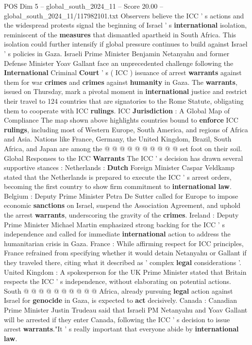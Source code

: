 \begin{textsample}{POS Dim 5 – global\_south\_2024\_11 – Score 20.00 – global\_south\_2024\_11/117982101.txt}
Observers believe the ICC ' s actions and the widespread protests signal the beginning of Israel ' s \textbf{international} isolation, reminiscent of the \textbf{measures} that dismantled apartheid in South Africa.
This isolation could further intensify if global pressure continues to build against Israel ' s policies in Gaza.
Israeli Prime Minister Benjamin Netanyahu and former Defense Minister Yoav Gallant face an unprecedented challenge following the \textbf{International} Criminal \textbf{Court} ' s ( ICC ) issuance of arrest \textbf{warrants} against them for war \textbf{crimes} and \textbf{crimes} against \textbf{humanity} in Gaza.
The \textbf{warrants}, issued on Thursday, mark a pivotal moment in \textbf{international} justice and restrict their travel to 124 countries that are signatories to the Rome Statute, obligating them to cooperate with ICC \textbf{rulings}.
ICC \textbf{Jurisdiction} : A Global Map of Compliance The map shown above highlights countries bound to \textbf{enforce} ICC \textbf{rulings}, including most of Western Europe, South America, and regions of Africa and Asia.
Nations like France, Germany, the United Kingdom, Brazil, South Africa, and Japan are among the @ @ @ @ @ @ @ @ @ @ set foot on their soil.
Global Responses to the ICC \textbf{Warrants} The ICC ' s decision has drawn several supportive stances : Netherlands : \textbf{Dutch} Foreign Minister Caspar Veldkamp stated that the Netherlands is prepared to execute the ICC ' s arrest orders, becoming the first country to show firm commitment to \textbf{international} \textbf{law}.
Belgium : Deputy Prime Minister Petra De Sutter called for Europe to impose economic \textbf{sanctions} on Israel, suspend the Association Agreement, and uphold the arrest \textbf{warrants}, underscoring the gravity of the \textbf{crimes}.
Ireland : Deputy Prime Minister Michael Martin emphasized strong backing for the ICC ' s independence and called for immediate \textbf{international} action to address the humanitarian crisis in Gaza.
France : While affirming respect for ICC principles, France refrained from specifying whether it would detain Netanyahu or Gallant if they traveled there, citing what it described as ' complex \textbf{legal} considerations '.
United Kingdom : A spokesperson for the UK Prime Minister stated that Britain respects the ICC ' s independence, without elaborating on potential actions.
South @ @ @ @ @ @ @ @ @ @ Africa, already pursuing \textbf{legal} action against Israel for \textbf{genocide} in Gaza, is expected to \textbf{act} decisively.
Canada : Canadian Prime Minister Justin Trudeau said that Israeli PM Netanyahu and Yoav Gallant will be arrested if they enter Canada, following the ICC ' s decision to issue arrest \textbf{warrants}."It ' s really important that everyone abide by \textbf{international} \textbf{law}.

\end{textsample}

